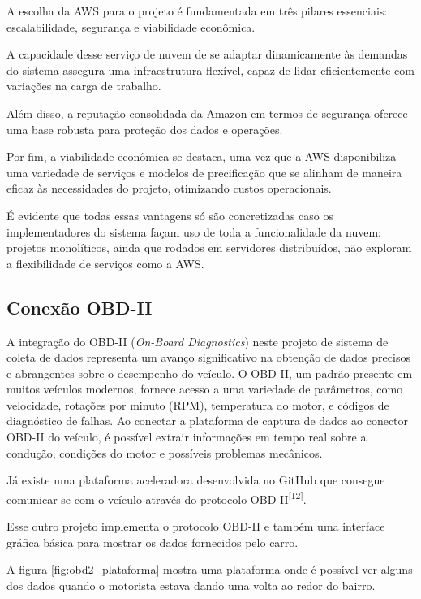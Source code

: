     A escolha da AWS para o projeto é fundamentada em três pilares essenciais: escalabilidade, segurança e viabilidade econômica. 
    
    A capacidade desse serviço de nuvem de se adaptar dinamicamente às demandas do sistema assegura uma infraestrutura flexível, capaz de lidar eficientemente com variações na carga de trabalho. 
    
    Além disso, a reputação consolidada da Amazon em termos de segurança oferece uma base robusta para proteção dos dados e operações. 
    
    Por fim, a viabilidade econômica se destaca, uma vez que a AWS disponibiliza uma variedade de serviços e modelos de precificação que se alinham de maneira eficaz às necessidades do projeto, otimizando custos operacionais.

    É evidente que todas essas vantagens só são concretizadas caso os implementadores do sistema façam uso de toda a funcionalidade da nuvem: projetos monolíticos, ainda que rodados em servidores distribuídos, não exploram a flexibilidade de serviços como a AWS. 

    \subsection{Conexão OBD-II}

    A integração do OBD-II (\textit{On-Board Diagnostics}) neste projeto de sistema de coleta de dados representa um avanço significativo na obtenção de dados precisos e abrangentes sobre o desempenho do veículo. O OBD-II, um padrão presente em muitos veículos modernos, fornece acesso a uma variedade de parâmetros, como velocidade, rotações por minuto (RPM), temperatura do motor, e códigos de diagnóstico de falhas. Ao conectar a plataforma de captura de dados ao conector OBD-II do veículo, é possível extrair informações em tempo real sobre a condução, condições do motor e possíveis problemas mecânicos.

    Já existe uma plataforma aceleradora desenvolvida no GitHub que consegue comunicar-se com o veículo através do protocolo OBD-II\textsuperscript{[12]}. 
    
    Esse outro projeto implementa o protocolo OBD-II e também uma interface gráfica básica para mostrar os dados fornecidos pelo carro.

    A figura \ref{fig:obd2_plataforma} mostra uma plataforma onde é possível ver alguns dos dados quando o motorista estava dando uma volta ao redor do bairro.

